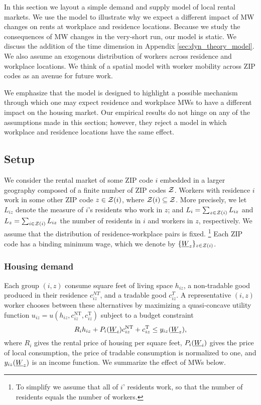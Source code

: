 
In this section we layout a simple demand and supply model of local rental markets.
We use the model to illustrate why we expect a different impact of MW changes 
on rents at workplace and residence locations.
Because we study the consequences of MW changes in the very-short run, our model is 
static.
We discuss the addition of the time dimension in Appendix \ref{sec:dyn_theory_model}.
We also assume an exogenous distribution of workers across residence and workplace 
locations.
We think of a spatial model with worker mobility across ZIP codes as an avenue 
for future work.

We emphasize that the model is designed to highlight a possible mechanism through 
which one may expect residence and workplace MWs to have a different impact on the 
housing market.
Our empirical results do not hinge on any of the assumptions made in this section;
however, they reject a model in which workplace and residence locations have the 
same effect.

\subsection{Setup}

We consider the rental market of some ZIP code $i$ embedded in a larger geography 
composed of a finite number of ZIP codes $\mathcal{Z}$.
Workers with residence $i$ work in some other ZIP code $z\in\mathcal{Z}(i)$, where 
$\mathcal{Z}(i)\subseteq\mathcal{Z}$.
More precisely, we let $L_{iz}$ denote the measure of $i$'s residents who work in 
$z$; and 
$L_i = \sum_{z \in \mathcal{Z}(i)} L_{iz}$ and $L_z = \sum_{i \in \mathcal{Z}(i)} L_{iz}$ the number
of residents in $i$ and workers in $z$, respectively.
We assume that the distribution of residence-workplace pairs is fixed.%
\footnote{To simplify we assume that all of $i$' residents work, so that the number
of residents equals the number of workers.}
Each ZIP code has a binding minimum wage, which we denote by $\{\underline{W}_z\}_{z\in\mathcal{Z}(i)}$.

\subsubsection*{Housing demand}

Each group $(i,z)$ consume
square feet of living space $h_{iz}$, 
a non-tradable good produced in their residence $c_{iz}^{NT}$, and
a tradable good $c_{iz}^T$.
A representative $(i,z)$ worker chooses between these alternatives by maximizing
a quasi-concave utility function 
$u_{iz} = u \left(h_{iz}, c^{\text{NT}}_{iz}, c^{\text{T}}_{iz}\right)$
subject to a budget constraint
$$R_i h_{iz} + P_i(\underline{W}_i) c^{\text{NT}}_{iz} + c^{\text{T}}_{iz} \leq y_{iz}(\underline{W}_z),$$
where
$R_i$ gives the rental price of housing per square feet,
$P_i(\underline{W}_i)$ gives the price of local consumption,
the price of tradable consumption is normalized to one, and 
$y_{iz}(\underline{W}_z)$ is an income function.
We summarize the effect of MWs below.

